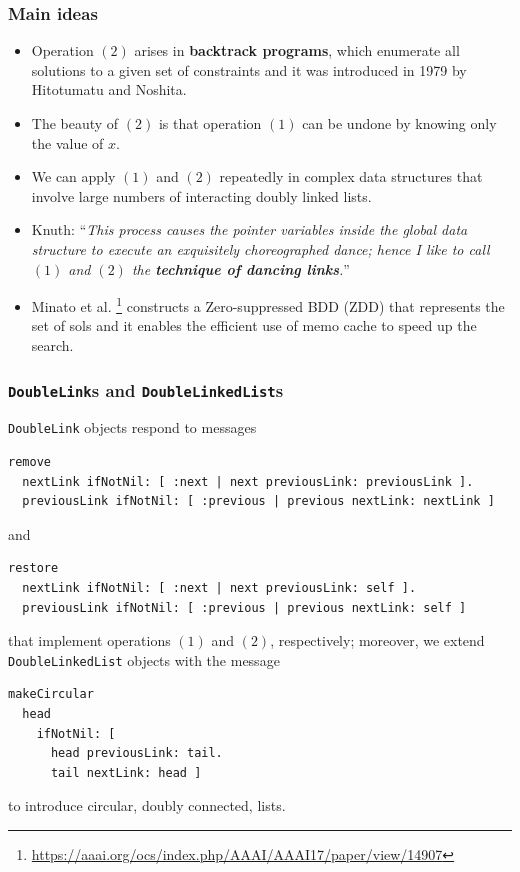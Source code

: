\documentclass[10pt]{beamer}
\begin{document}
\begin{frame}[fragile]
\frametitle{Main ideas}

\begin{itemize}
  \item Operation $(2)$ arises in \textbf{backtrack programs}, which enumerate all 
  solutions to a given set of constraints and it was introduced in 1979 by Hitotumatu and Noshita.
  \item The beauty of $(2)$ is that operation $(1)$ can be undone by knowing only the value of $x$.
  \item We can apply $(1)$ and $(2)$ repeatedly in complex data structures that involve large 
  numbers of interacting doubly linked lists.
  \item Knuth: ``\emph{This process causes the pointer variables inside the global data structure to execute an 
    exquisitely choreographed dance; hence I like to call $(1)$ and $(2)$ the \textbf{technique of dancing links}.}''
  \item Minato et al. \footnote{\url{https://aaai.org/ocs/index.php/AAAI/AAAI17/paper/view/14907}} 
  constructs a Zero-suppressed BDD (ZDD) that represents the set of sols and it enables the efficient 
  use of memo cache to speed up the search.
\end{itemize}
\end{frame}

\begin{frame}[fragile]
\frametitle{\texttt{DoubleLink}s and \texttt{DoubleLinkedList}s}
\texttt{DoubleLink} objects respond to messages
\begin{verbatim}
remove
  nextLink ifNotNil: [ :next | next previousLink: previousLink ].
  previousLink ifNotNil: [ :previous | previous nextLink: nextLink ]
\end{verbatim}
and
\begin{verbatim}
restore
  nextLink ifNotNil: [ :next | next previousLink: self ].
  previousLink ifNotNil: [ :previous | previous nextLink: self ]
\end{verbatim}
that implement operations $(1)$ and $(2)$, respectively;
moreover, we extend \texttt{DoubleLinkedList} objects with the message
\begin{verbatim}
makeCircular
  head
    ifNotNil: [ 
      head previousLink: tail.
      tail nextLink: head ]
\end{verbatim}
to introduce circular, doubly connected, lists.
\end{frame}
\end{document}
